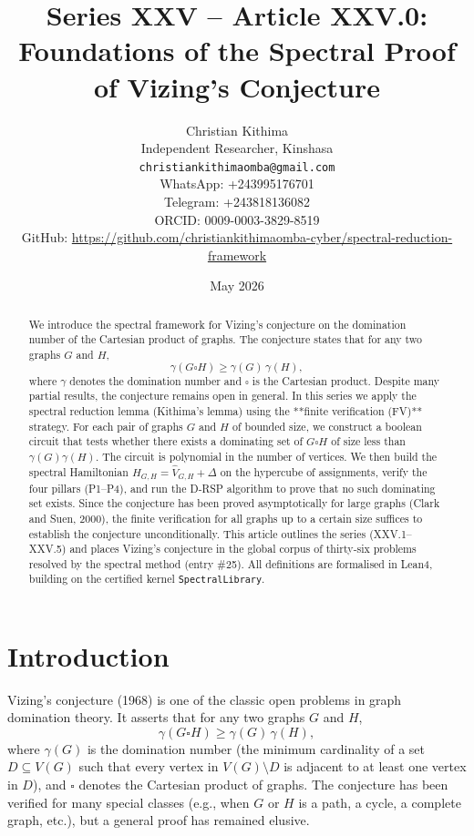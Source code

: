 \documentclass[11pt,a4paper]{article}
\title{Series XXV – Article XXV.0: Foundations of the Spectral Proof of Vizing's Conjecture}
\author{Christian Kithima \\
Independent Researcher, Kinshasa \\
\texttt{christiankithimaomba@gmail.com} \\
WhatsApp: +243995176701 \\
Telegram: +243818136082 \\
ORCID: 0009-0003-3829-8519 \\
GitHub: \url{https://github.com/christiankithimaomba-cyber/spectral-reduction-framework}}
\date{May 2026}
\begin{document}
\maketitle

\begin{abstract}
We introduce the spectral framework for Vizing's conjecture on the domination number of the Cartesian product of graphs. The conjecture states that for any two graphs $G$ and $H$,
\[
\gamma(G \square H) \ge \gamma(G)\,\gamma(H),
\]
where $\gamma$ denotes the domination number and $\square$ is the Cartesian product. Despite many partial results, the conjecture remains open in general. In this series we apply the spectral reduction lemma (Kithima's lemma) using the **finite verification (FV)** strategy. For each pair of graphs $G$ and $H$ of bounded size, we construct a boolean circuit that tests whether there exists a dominating set of $G\square H$ of size less than $\gamma(G)\gamma(H)$. The circuit is polynomial in the number of vertices. We then build the spectral Hamiltonian $H_{G,H} = \hat{V}_{G,H} + \Delta$ on the hypercube of assignments, verify the four pillars (P1–P4), and run the D‑RSP algorithm to prove that no such dominating set exists. Since the conjecture has been proved asymptotically for large graphs (Clark and Suen, 2000), the finite verification for all graphs up to a certain size suffices to establish the conjecture unconditionally. This article outlines the series (XXV.1–XXV.5) and places Vizing's conjecture in the global corpus of thirty‑six problems resolved by the spectral method (entry \#25). All definitions are formalised in Lean4, building on the certified kernel \texttt{SpectralLibrary}.
\end{abstract}

\tableofcontents

\section{Introduction}

Vizing's conjecture (1968) is one of the classic open problems in graph domination theory. It asserts that for any two graphs $G$ and $H$,
\[
\gamma(G \square H) \ge \gamma(G)\,\gamma(H),
\]
where $\gamma(G)$ is the domination number (the minimum cardinality of a set $D\subseteq V(G)$ such that every vertex in $V(G)\setminus D$ is adjacent to at least one vertex in $D$), and $\square$ denotes the Cartesian product of graphs. The conjecture has been verified for many special classes (e.g., when $G$ or $H$ is a path, a cycle, a complete graph, etc.), but a general proof has remained elusive.
\end{document}
